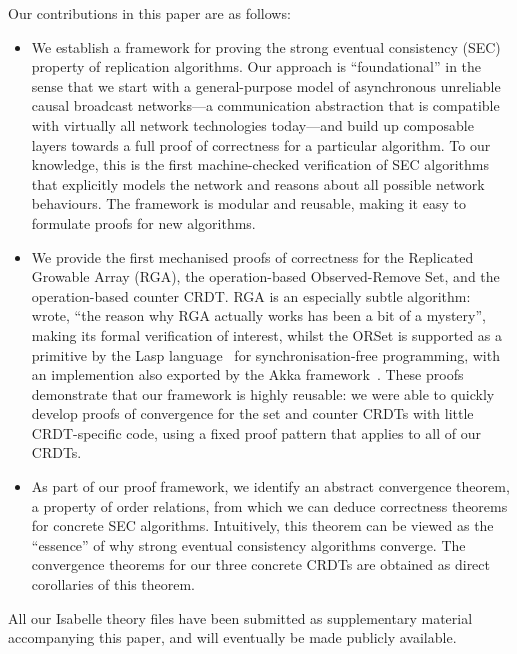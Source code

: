 \documentclass[acmlarge,review,anonymous]{acmart}
\begin{document}
Our contributions in this paper are as follows:
\begin{itemize}
\item
We establish a framework for proving the strong eventual consistency (SEC) property of replication algorithms.
Our approach is ``foundational'' in the sense that we start with a general-purpose model of asynchronous unreliable causal broadcast networks---a communication abstraction that is compatible with virtually all network technologies today---and build up composable layers towards a full proof of correctness for a particular algorithm.
To our knowledge, this is the first machine-checked verification of SEC algorithms that explicitly models the network and reasons about all possible network behaviours.
The framework is modular and reusable, making it easy to formulate proofs for new algorithms.
\item
We provide the first mechanised proofs of correctness for the Replicated Growable Array (RGA), the operation-based Observed-Remove Set, and the operation-based counter CRDT.
RGA is an especially subtle algorithm: \citet{Attiya:2016kh} wrote, ``the reason why RGA actually works has been a bit of a mystery'', making its formal verification of interest, whilst the ORSet is supported as a primitive by the Lasp language~\cite{DBLP:conf/ppdp/MeiklejohnR15} for synchronisation-free programming, with an implemention also exported by the Akka framework~\cite{akka}.
These proofs demonstrate that our framework is highly reusable: we were able to quickly develop proofs of convergence for the set and counter CRDTs with little CRDT-specific code, using a fixed proof pattern that applies to all of our CRDTs.
\item
As part of our proof framework, we identify an abstract convergence theorem, a property of order relations, from which we can deduce correctness theorems for concrete SEC algorithms.
Intuitively, this theorem can be viewed as the ``essence'' of why strong eventual consistency algorithms converge.
The convergence theorems for our three concrete CRDTs are obtained as direct corollaries of this theorem.
\end{itemize}

All our Isabelle theory files have been submitted as supplementary material accompanying this paper, and will eventually be made publicly available.








\end{document}
